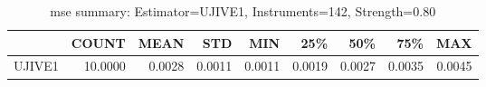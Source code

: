 \begin{table}[ht]
\centering
\caption{mse summary: Estimator=UJIVE1, Instruments=142, Strength=0.80}
\begin{tabular}{lrrrrrrrr}
\toprule
 & COUNT & MEAN & STD & MIN & 25\% & 50\% & 75\% & MAX \\
\midrule
UJIVE1 & 10.0000 & 0.0028 & 0.0011 & 0.0011 & 0.0019 & 0.0027 & 0.0035 & 0.0045 \\
\bottomrule
\end{tabular}
\end{table}
